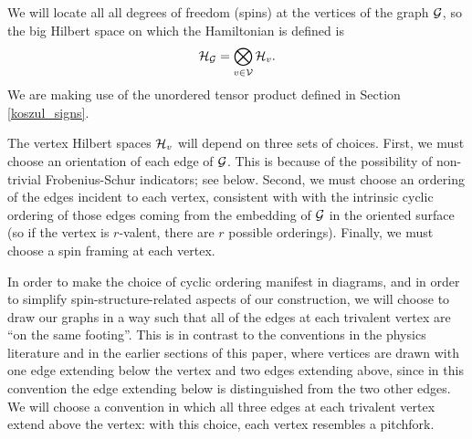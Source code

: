 We will locate all all degrees of freedom (spins) at the vertices of the graph $\mathcal{G}$, so
the big Hilbert space on which the Hamiltonian is defined is
\begin{align}	\label{GraphHilbertSpace}
 \mch_\mcg =\bigotimes_{v \in \mcv} \mch_v.  %
\end{align}
We are making use of the unordered tensor product defined in Section \ref{koszul_signs}.

The vertex Hilbert spaces $\mathcal{H}_{v}$ will depend on three sets of choices.
First, we must choose an orientation of each edge of $\mathcal{G}$.
This is because of the possibility of non-trivial Frobenius-Schur indicators; see below.
Second, we must choose an ordering of the edges incident to each vertex, consistent with with the intrinsic cyclic ordering of those edges
coming from the embedding of $\mathcal{G}$ in the oriented surface
(so if the vertex is $r$-valent, there are $r$ possible orderings).
Finally, we must choose a spin framing at each vertex.

In order to make the choice of cyclic ordering manifest in diagrams, and in order to simplify spin-structure-related
aspects of our construction, we will choose to draw our graphs in a way such that all of the 
edges at each trivalent vertex are ``on the same footing''. This is in contrast to the conventions in the physics literature
and in the earlier sections of this paper, where vertices are drawn with one edge extending below the vertex and two 
edges extending above, since in this convention the edge extending below is distinguished from the two other edges.
We will choose a convention in which all three edges at each trivalent vertex extend above the vertex: with this
choice, each vertex resembles a pitchfork. 

